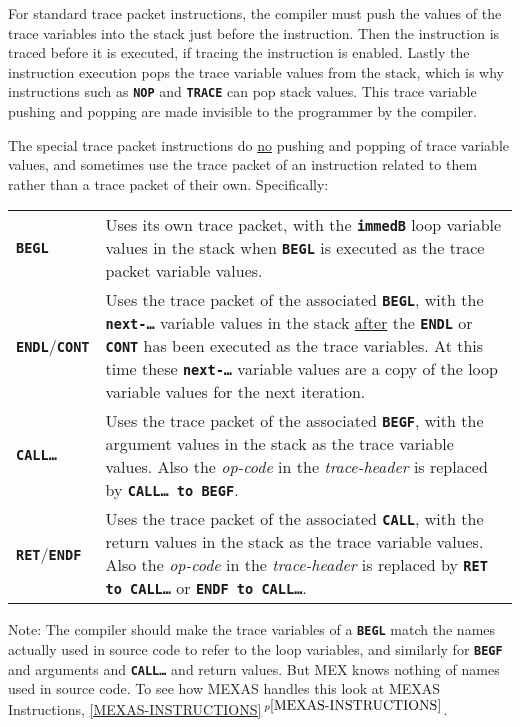 \documentclass[12pt]{article}
\newcommand{\TT}[1]{{\tt \bfseries #1}}
\newcommand{\itemref}[1]{\ref{#1}$\,^{p\pageref{#1}}$}
\begin{document}
For standard trace packet instructions, the compiler must push
the values of the trace variables into the stack just
before the instruction.  Then the instruction is traced before
it is executed, if tracing the instruction is enabled.  Lastly
the instruction execution pops the trace variable
values from the stack, which is why instructions such as \TT{NOP} and
\TT{TRACE}
can pop stack values.  This trace variable pushing and popping are made
invisible to the programmer by the compiler.

The special trace packet instructions do \underline{no} pushing and popping
of trace variable values, and sometimes use the trace packet
of an instruction related to them rather than a trace packet of their
own.  Specifically:

\begin{center}
\begin{tabular}{lp{4.0in}}
\TT{BEGL}  & Uses its own trace packet, with the \TT{immedB} loop variable
             values in the stack when \TT{BEGL} is executed as the trace packet 
	     variable values.
\\[0.5ex]
\TT{ENDL}/\TT{CONT}  & Uses the trace packet of the associated \TT{BEGL},
                       with the \TT{next-\ldots} variable values in the
		       stack \underline{after} the \TT{ENDL} or \TT{CONT}
		       has been executed as the trace variables.
		       At this time these \TT{next-\ldots} variable values
		       are a copy of the loop variable values for the next
		       iteration.
\\[0.5ex]
\TT{CALL\ldots}  & Uses the trace packet of the associated \TT{BEGF},
                   with the argument values in the stack as the trace
		   variable values. 
		   Also the {\em op-code}
		   in the {\em trace-header} is replaced by
		   \TT{CALL\ldots{}~to BEGF}\label{CALL-TO-BEGF}.
\\[0.5ex]
\TT{RET}/\TT{ENDF}  & Uses the trace packet of the associated \TT{CALL},
                   with the return values in the stack as the trace
		   variable values.
		   Also the {\em op-code}
		   in the {\em trace-header} is replaced by
		   \TT{RET to CALL\ldots}\label{RET-TO-CALL}
		   or \TT{ENDF to CALL\ldots}.
\end{tabular}
\end{center}

Note: The compiler should make the trace variables of a \TT{BEGL}
match the names actually used in source code to refer to the loop
variables, and similarly for \TT{BEGF} and arguments and \TT{CALL\ldots}
and return values.
But MEX knows nothing of names used in source code.
To see how MEXAS handles this look at MEXAS Instructions,
\itemref{MEXAS-INSTRUCTIONS}.
\end{document}

